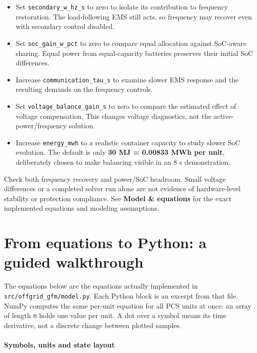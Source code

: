 \documentclass[11pt,a4paper]{article}
\begin{document}
\begin{itemize}
\item Set \texttt{secondary\_w\_hz\_s} to zero to isolate its contribution to frequency restoration. The load-following EMS still acts, so frequency may recover even with secondary control disabled.
\item Set \texttt{soc\_gain\_w\_pct} to zero to compare equal allocation against SoC-aware sharing. Equal power from equal-capacity batteries preserves their initial SoC differences.
\item Increase \texttt{communication\_tau\_s} to examine slower EMS response and the resulting demands on the frequency controls.
\item Set \texttt{voltage\_balance\_gain\_s} to zero to compare the estimated effect of voltage compensation. This changes voltage diagnostics, not the active-power/frequency solution.
\item Increase \texttt{energy\_mwh} to a realistic container capacity to study slower SoC evolution. The default is only \textbf{30 MJ = 0.00833 MWh per unit}, deliberately chosen to make balancing visible in an 8 s demonstration.

\end{itemize}
Check both frequency recovery and power/SoC headroom. Small voltage differences or a completed solver run alone are not evidence of hardware-level stability or protection compliance. See \textbf{Model \& equations} for the exact implemented equations and modeling assumptions.

\clearpage
\part{From equations to Python: a guided walkthrough}

The equations below are the equations actually implemented in \texttt{src/offgrid\_gfm/model.py}. Each Python block is an excerpt from that file. NumPy computes the same per-unit equation for all PCS units at once: an array of length \texttt{n} holds one value per unit. A dot over a symbol means its time derivative, not a discrete change between plotted samples.

\subsection{Symbols, units and state layout}
\end{document}
